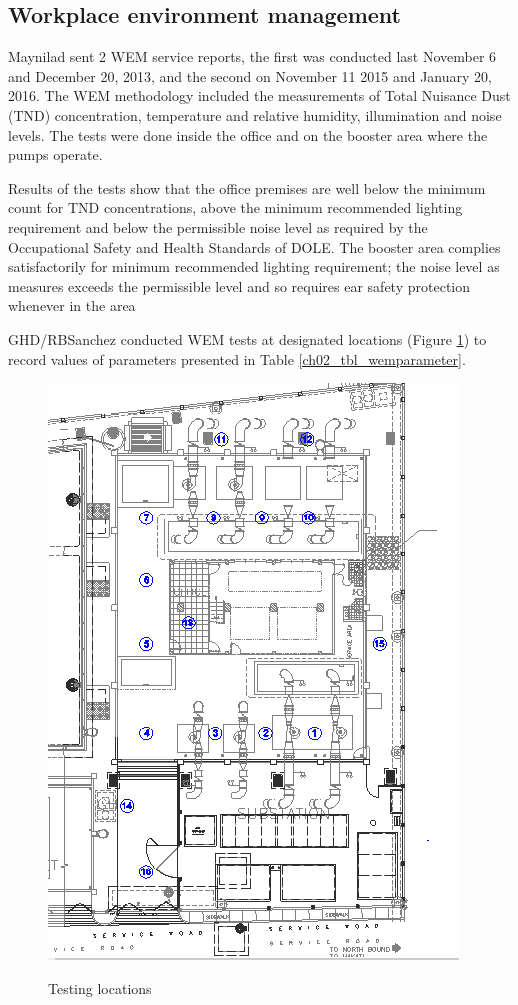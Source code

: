 \subsection{Workplace environment management}
\label{237}
Maynilad sent 2 WEM service reports, the first was conducted last November 6 and December 20, 2013, and the second on November 11 2015 and January 20, 2016. The WEM methodology included the measurements of Total Nuisance Dust (TND) concentration, temperature and relative humidity, illumination and noise levels. The tests were done inside the office and on the booster area where the pumps operate.

Results of the tests show that the office premises are well below the minimum count for TND concentrations, above the minimum recommended lighting requirement and below the permissible noise level as required by the Occupational Safety and Health Standards of DOLE. The booster area complies satisfactorily for minimum recommended lighting requirement; the noise level as measures exceeds the permissible level and so requires ear safety protection whenever in the area

GHD/RBSanchez conducted WEM tests at designated locations (Figure \ref{ch02_wem01}) to record values of parameters presented in Table \ref{ch02_tbl_wemparameter}.

\begin{figure}[!htb]
	\includegraphics[scale=1.2]{figures/ch02_wem01} \\
	\caption{Testing locations}
	\label{ch02_wem01} 
\end{figure}

